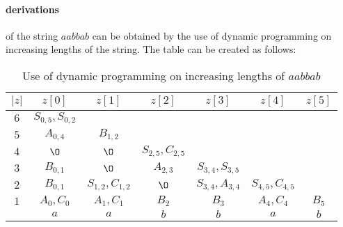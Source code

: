 \documentclass[11pt,letterpaper]{article}
\begin{document}
\paragraph{derivations} of the string $aabbab$ can be obtained by the use of dynamic programming on increasing lengths of the string. The table can be created as follows:
\begin{table}[]
    \centering
    \begin{tabular}{c | c c c c c c}
    $|z|$ & $z[0]$ & $z[1]$ & $z[2]$ & $z[3]$ & $z[4]$ & $z[5]$ \\
    \hline
    $6$ & $S_{0,5},S_{0,2}$ &
    \\
    $5$ & $A_{0,4}$ & $B_{1,2}$ &
    \\
    $4$ & $\O$ & $\O$ & $S_{2,5},C_{2,5}$ &
    \\
    $3$ & $B_{0,1}$ & $\O$ & $A_{2,3}$ & $S_{3,4},S_{3,5}$ &
    \\
    $2$ & $B_{0,1}$ & $S_{1,2},C_{1,2}$ & $\O$ & $S_{3,4},A_{3,4}$ &$S_{4,5},C_{4,5}$ &
    \\
    $1$ & $A_{0},C_{0}$ & $A_{1},C_{1}$ & $B_{2}$ & $B_{3}$ & $A_{4},C_{4}$ & $B_{5}$ \\
    \hline
    & $a$ & $a$ & $b$ & $b$ & $a$ & $b$ \\
    \end{tabular}
    \caption{Use of dynamic programming on increasing lengths of $aabbab$}
    \label{tab:dynamic}
\end{table}
\end{document}
